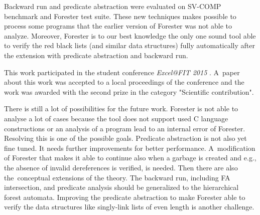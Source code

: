Backward run and predicate abstraction were evaluated on SV-COMP benchmark and
Forester test suite.
These new techniques makes possible to process some programs that the earlier version
of Forester was not able to analyze.
Moreover, Forester is to our best knowledge the only one sound tool
able to verify the red black lists (and similar data structures)
fully automatically after the extension with predicate abstraction and backward run.

This work participated in the student conference \emph{Excel@FIT 2015} \cite{www:excel}.
A~paper about this work was accepted to a local proceedings of the conference
and the work was awarded with the second prize in the category "Scientific contribution".

There is still a lot of possibilities for the future work.
Forester is not able to analyse a lot of cases
because the tool does not support used C language constructions
or an analysis of a program lead to an internal error of Forester.
Resolving this is one of the possible goals.
Predicate abstraction is not also yet fine tuned.
It needs further improvements for better performance.
A~modification of Forester that makes it able to continue also
when a garbage is created and e.g., the absence of invalid
dereferences is verified, is needed.
Then there are also the~conceptual extensions of the theory.
The backward run, including FA intersection, and predicate analysis should be generalized
to the hierarchical forest automata.
Improving the predicate abstraction to make Forester able to verify
the data structures like singly-link lists of even length is
another challenge.
